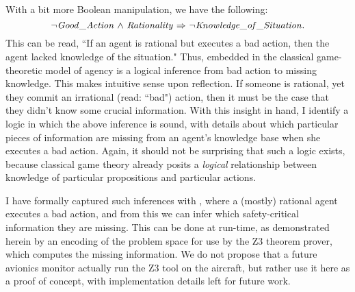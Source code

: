 With a bit more Boolean manipulation, we have the following:
\begin{equation*}
{\neg} \mathit{Good\_Action} {\ \wedge \ } \mathit{Rationality} {\ \Rightarrow \ } {\neg} \mathit{Knowledge\_of\_Situation}.
\end{equation*}
This can be read, ``If an agent is rational but executes a bad action, then the agent lacked knowledge of the situation." Thus, embedded in the classical game-theoretic model of agency is a logical inference from bad action to missing knowledge. This makes intuitive sense upon reflection. If someone is rational, yet they commit an irrational (read: ``bad") action, then it must be the case that they didn't know some crucial information. With this insight in hand, I identify a logic in which the above inference is sound, with details about which particular pieces of information are missing from an agent's knowledge base when she executes a bad action. Again, it should not be surprising that such a logic exists, because classical game theory already posits a \emph{logical} relationship between knowledge of particular propositions and particular actions.

I have formally captured such inferences with \DASL, where a (mostly) rational agent executes a bad action, and from this we can infer which safety-critical information they are missing. This can be done at run-time, as demonstrated herein by an encoding of the problem space for use by the Z3 theorem prover, which computes the missing information. We do not propose that a future avionics monitor actually run the Z3 tool on the aircraft, but rather use it here as a proof of concept, with implementation details left for future work.


